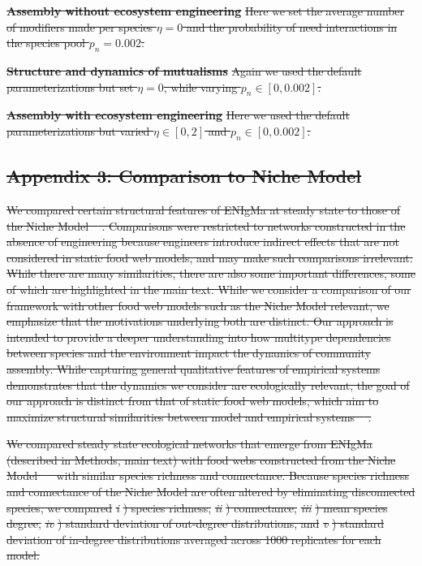 \documentclass[twocolumn,preprintnumbers,amsmath,amssymb,superscriptaddress,linenumbers]{revtex4-1}
\providecommand{\DIFdel}[1]{{\protect\color{red}\sout{#1}}}                      %
\begin{document}
\textbf{\DIFdel{Assembly without ecosystem engineering}} %
\DIFdel{Here we set the average number of modifiers made per species $\eta = 0$ and the probability of need interactions in the species pool $p_n=0.002$.
}%

\textbf{\DIFdel{Structure and dynamics of mutualisms}} %
\DIFdel{Again we used the default parameterizations but set $\eta = 0$, while varying $p_n \in [0,0.002]$.
}%

\textbf{\DIFdel{Assembly with ecosystem engineering}} %
\DIFdel{Here we used the default parameterizations but varied $\eta \in [0,2]$ and $p_n \in [0,0.002]$.
}%

\subsection*{\DIFdel{Appendix 3: Comparison to Niche Model}}
\DIFdel{We compared certain structural features of ENIgMa at steady state to those of the Niche Model \mbox{%
\cite{Williams2000}}\hspace{0pt}%
.
Comparisons were restricted to networks constructed in the absence of engineering because engineers introduce indirect effects that are not considered in static food web models, and may make such comparisons irrelevant.
While there are many similarities, there are also some important differences, some of which are highlighted in the main text.
While we consider a comparison of our framework with other food web models such as the Niche Model relevant, we emphasize that the motivations underlying both are distinct.
Our approach is intended to provide a deeper understanding into how multitype dependencies between species and the environment impact the dynamics of community assembly.
While capturing general qualitative features of empirical systems demonstrates that the dynamics we consider are ecologically relevant, the goal of our approach is distinct from that of static food web models, which aim to maximize structural similarities between model and empirical systems \mbox{%
\cite{Williams2000,Williams2011}}\hspace{0pt}%
.
}%

\DIFdel{We compared steady state ecological networks that emerge from ENIgMa (described in Methods, main text) with food webs constructed from the Niche Model \mbox{%
\cite{Williams2000} }\hspace{0pt}%
with similar species richness and connectance.
Because species richness and connectance of the Niche Model are often altered by eliminating disconnected species, we compared
}\emph{\DIFdel{i}}%
\DIFdel{) species richness,
}\emph{\DIFdel{ii}}%
\DIFdel{) connectance,
}\emph{\DIFdel{iii}}%
\DIFdel{) mean species degree,
}\emph{\DIFdel{iv}}%
\DIFdel{) standard deviation of out-degree distributions, and
}\emph{\DIFdel{v}}%
\DIFdel{) standard deviation of in-degree distributions
averaged across 1000 replicates for each model.
}%
\end{document}

